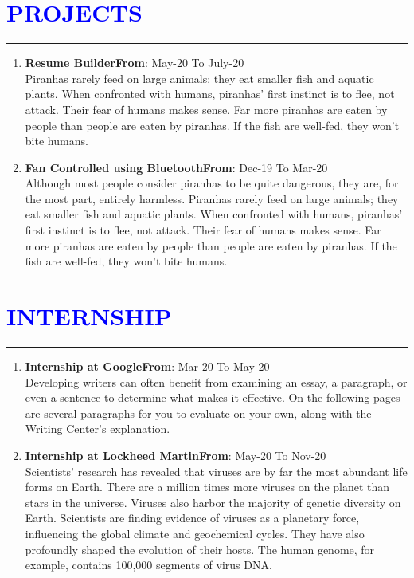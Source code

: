 \documentclass{article}
\begin{document}
\vspace{3pt}
\section*{\large{\textcolor{blue}{\uppercase{projects}}}}
\hrule
\vspace{3pt}
\begin{enumerate}
	\item {\textbf{Resume Builder}}\hfill {\textbf{From}}: May-20 To July-20\\
	Piranhas rarely feed on large animals; they eat smaller fish and aquatic plants. When confronted with humans, piranhas’ first instinct is to flee, not attack. Their fear of humans makes sense. Far more piranhas are eaten by people than people are eaten by piranhas. If the fish are well-fed, they won’t bite humans.
	\item {\textbf{Fan Controlled using Bluetooth}}\hfill {\textbf{From}}: Dec-19 To Mar-20\\
	Although most people consider piranhas to be quite dangerous, they are, for the most part, entirely harmless. Piranhas rarely feed on large animals; they eat smaller fish and aquatic plants. When confronted with humans, piranhas’ first instinct is to flee, not attack. Their fear of humans makes sense. Far more piranhas are eaten by people than people are eaten by piranhas. If the fish are well-fed, they won’t bite humans.
\end{enumerate}
	
\vspace{3pt}
\section*{\large{\textcolor{blue}{\uppercase{Internship}}}}
\hrule
\vspace{3pt}
\begin{enumerate}
	\item {\textbf{Internship at Google}}\hfill {\textbf{From}}: Mar-20 To May-20\\
	Developing writers can often benefit from examining an essay, a paragraph, or even a sentence to determine what makes it effective. On the following pages are several paragraphs for you to evaluate on your own, along with the Writing Center's explanation.
	\item {\textbf{Internship at Lockheed Martin}}\hfill {\textbf{From}}: May-20 To Nov-20\\
	 Scientists' research has revealed that viruses are by far the most abundant life forms on Earth. There are a million times more viruses on the planet than stars in the universe. Viruses also harbor the majority of genetic diversity on Earth. Scientists are finding evidence of viruses as a planetary force, influencing the global climate and geochemical cycles. They have also profoundly shaped the evolution of their hosts. The human genome, for example, contains 100,000 segments of virus DNA.
\end{enumerate}
\end{document}
